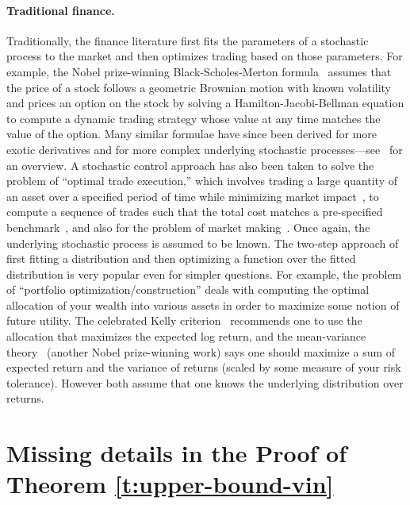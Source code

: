 \documentclass[final,12pt]{colt2025}
\begin{document}
\paragraph{Traditional finance.}
Traditionally, the finance literature first fits the parameters of a stochastic process to the market and then optimizes trading based on those parameters. For example, the Nobel prize-winning Black-Scholes-Merton formula~\citep{black1973pricing} assumes that the price of a stock follows a geometric Brownian motion with known volatility and prices an option on the stock by solving a Hamilton-Jacobi-Bellman equation to compute a dynamic trading strategy whose value at any time matches the value of the option. Many similar formulae have since been derived for more exotic derivatives and for more complex underlying stochastic processes---see~\citep{hull2017options} for an overview. A stochastic control approach has also been taken to solve the problem of ``optimal trade execution,'' which involves trading a large quantity of an asset over a specified period of time while minimizing market impact~\citep{almgren2001optimal,bertsimas1998optimal}, to compute a sequence of trades such that the total cost matches a pre-specified benchmark~\citep{konishi2002optimal}, and also for the problem of market making~\citep{cartea2015algorithmic}. Once again, the underlying stochastic process is assumed to be known.
%
The two-step approach of first fitting a distribution and then optimizing a function over the fitted distribution is very popular even for simpler questions. For example, the problem of ``portfolio optimization/construction'' deals with computing the optimal allocation of your wealth into various assets in order to maximize some notion of future utility. The celebrated Kelly criterion~\citep{shalunov2020calculated,thorp1975portfolio,breiman1961optimal,hakansson1975optimal,maclean2011kelly} recommends one to use the allocation that maximizes the expected log return, and the mean-variance theory~\citep{markowitz} (another Nobel prize-winning work) says one should maximize a sum of expected return and the variance of returns (scaled by some measure of your risk tolerance). However both assume that one knows the underlying distribution over returns.










\section{Missing details in the Proof of Theorem \ref{t:upper-bound-vin}}
\label{s:missing-details-VIN}
\end{document}
